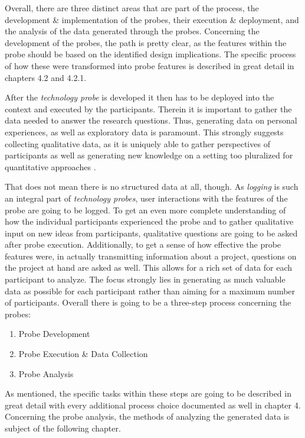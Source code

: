 Overall, there are three distinct areas that are part of the process, the development \& implementation of the probes, their execution \& deployment, and the analysis of the data generated through the probes. Concerning the development of the probes, the path is pretty clear, as the features within the probe should be based on the identified design implications. The specific process of how these were transformed into probe features is described in great detail in chapters 4.2 and 4.2.1.

After the \textit{technology probe} is developed it then has to be deployed into the context and executed by the participants. Therein it is important to gather the data needed to answer the research questions. Thus, generating data on personal experiences, as well as exploratory data is paramount. This strongly suggests collecting qualitative data, as it is uniquely able to gather perspectives of participants \cite[p. 7-8]{flick2018introduction} as well as generating new knowledge on a setting too pluralized for quantitative approaches \cite[p. 4-5]{flick2018introduction}.

That does not mean there is no structured data at all, though. As \textit{logging} is such an integral part of \textit{technology probes}, user interactions with the features of the probe are going to be logged. To get an even more complete understanding of how the individual participants experienced the probe and to gather qualitative input on new ideas from participants, qualitative questions are going to be asked after probe execution. Additionally, to get a sense of how effective the probe features were, in actually transmitting information about a project, questions on the project at hand are asked as well. This allows for a rich set of data for each participant to analyze. The focus strongly lies in generating as much valuable data as possible for each participant rather than aiming for a maximum number of participants. Overall there is going to be a three-step process concerning the probes:

\begin{enumerate}
  \item{Probe Development}
  \item{Probe Execution \& Data Collection}
  \item{Probe Analysis}
\end{enumerate}

As mentioned, the specific tasks within these steps are going to be described in great detail with every additional process choice documented as well in chapter 4. Concerning the probe analysis, the methods of analyzing the generated data is subject of the following chapter.

